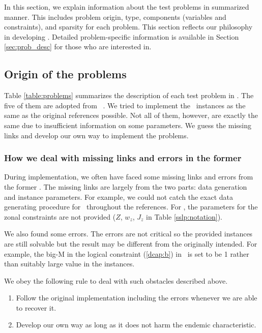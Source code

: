 In this section, we explain information about the test problems in summarized manner. This includes problem origin, type, components (variables and constraints), and sparsity for each problem. This section reflects our philosophy in developing \siplibtwo. Detailed problem-specific information is available in Section \ref{sec:prob_desc} for those who are interested in.

\subsection{Origin of the problems}
Table \ref{table:problems} summarizes the description of each test problem in \siplibtwo. The five of them are adopted from \siplib\ \cite{web:SIPLIB1}. We tried to implement the \siplib\ instances as the same as the original references possible. Not all of them, however, are exactly the same due to insufficient information on some parameters. We guess the missing links and develop our own way to implement the problems. 


\subsubsection{How we deal with missing links and errors in the former  \siplib}
During implementation, we often have faced some missing links and errors from the former \siplib. The missing links are largely from the two parts: data generation and instance parameters. For example, we could not catch the exact data generating procedure for \mptsps\ throughout the references. For \sslp, the parameters for the zonal constraints are not provided ($Z$, $w_z$, $J_z$ in Table \ref{sslp:notation}). 

We also found some errors. The errors are not critical so the provided instances are still solvable but the result may be different from the originally intended. For example, the big-M in the logical constraint (\ref{dcap:b}) in \dcap\ is set to be 1 rather than suitably large value in the instances. 

We obey the following rule to deal with such obstacles described above.
\begin{enumerate}
	\item Follow the original implementation including the errors whenever we are able to recover it.
	\item Develop our own way as long as it does not harm the endemic characteristic.
\end{enumerate}

